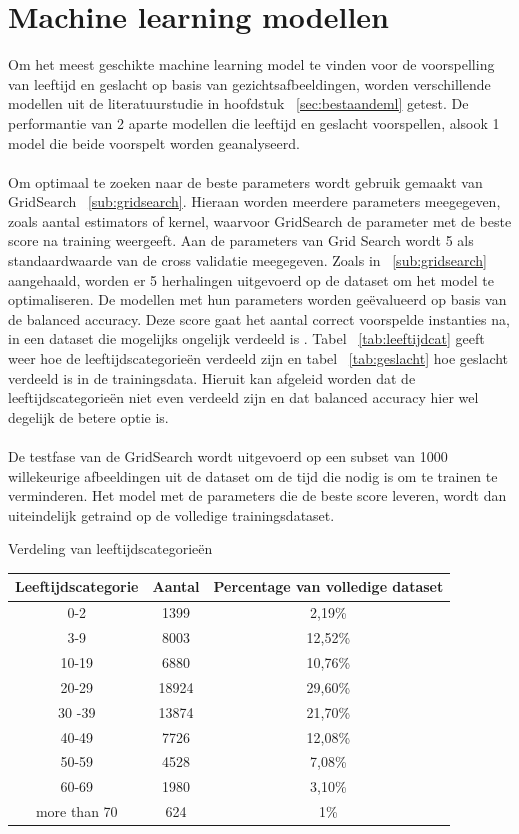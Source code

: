 \section{Machine learning modellen}\label{sec:poc-mlmodellen}
Om het meest geschikte machine learning model te vinden voor de voorspelling van leeftijd en geslacht op basis van gezichtsafbeeldingen, worden verschillende modellen uit de literatuurstudie in hoofdstuk ~\ref{sec:bestaandeml} getest. De performantie van 2 aparte modellen die leeftijd en geslacht voorspellen, alsook 1 model die beide voorspelt worden geanalyseerd. \\
\\
Om optimaal te zoeken naar de beste parameters wordt gebruik gemaakt van GridSearch ~\ref{sub:gridsearch}. Hieraan worden meerdere parameters meegegeven, zoals aantal estimators of kernel, waarvoor GridSearch de parameter met de beste score na training weergeeft. Aan de parameters van Grid Search wordt 5 als standaardwaarde van de cross validatie meegegeven. Zoals in ~\ref{sub:gridsearch} aangehaald, worden er 5 herhalingen uitgevoerd op de dataset om het model te optimaliseren. De modellen met hun parameters worden geëvalueerd op basis van de balanced accuracy. Deze score gaat het aantal correct voorspelde instanties na, in een dataset die mogelijks ongelijk verdeeld is \autocite{Garcia2009}. Tabel ~\ref{tab:leeftijdcat} geeft weer hoe de leeftijdscategorieën verdeeld zijn en tabel ~\ref{tab:geslacht} hoe geslacht verdeeld is in de trainingsdata. Hieruit kan afgeleid worden dat de leeftijdscategorieën niet even verdeeld zijn en dat balanced accuracy hier wel degelijk de betere optie is. \\
\\
De testfase van de GridSearch wordt uitgevoerd op een subset van 1000 willekeurige afbeeldingen uit de dataset om de tijd die nodig is om te trainen te verminderen. Het model met de parameters die de beste score leveren, wordt dan uiteindelijk getraind op de volledige trainingsdataset. \\
\begin{center}
    \caption{Verdeling van leeftijdscategorieën}
    \label{tab:leeftijdcat}
    \begin{tabular}{||c | c | c||} 
        \hline
        Leeftijdscategorie & Aantal & Percentage van volledige dataset  \\ 
        \hline
        0-2 & 1399 & 2,19\% \\
        \hline
        3-9 & 8003 & 12,52\% \\
        \hline
        10-19 & 6880 & 10,76\% \\
        \hline
        20-29 & 18924 & 29,60\% \\
        \hline 
        30 -39 & 13874 & 21,70\% \\
        \hline
        40-49 & 7726 & 12,08\% \\
        \hline 
        50-59 & 4528 & 7,08\% \\
        \hline 
        60-69 & 1980 & 3,10\% \\
        \hline 
        more than 70 & 624 & 1\% \\
    \end{tabular}
\end{center}

